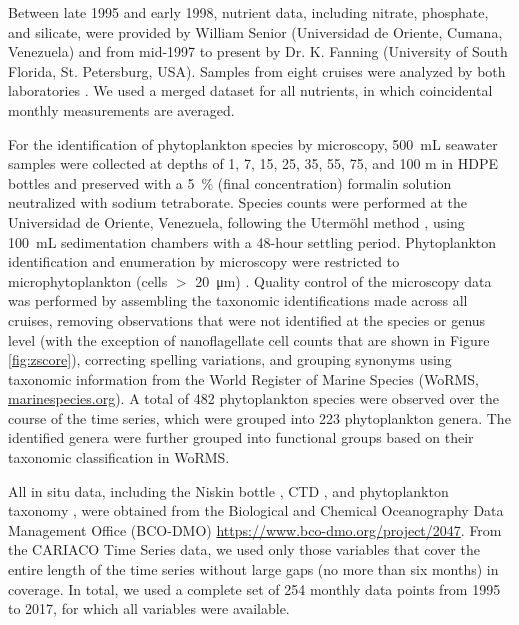 \documentclass[draft]{agujournal2019}
\begin{document}
    Between late 1995 and early 1998, nutrient data, including nitrate, phosphate, and silicate, were provided by William Senior (Universidad de Oriente, Cumana, Venezuela) and from mid-1997 to present by Dr. K. Fanning (University of South Florida, St. Petersburg, USA). Samples from eight cruises were analyzed by both laboratories \cite{taylor_ecosystem_2012}. We used a merged dataset for all nutrients, in which coincidental monthly measurements are averaged.
       
    For the identification of phytoplankton species by microscopy, \qty{500}{\milli\liter} seawater samples were collected at depths of 1, 7, 15, 25, 35, 55, 75, and 100 m in HDPE bottles and preserved with a \qty{5}{\%} (final concentration) formalin solution neutralized with sodium tetraborate. Species counts were performed at the Universidad de Oriente, Venezuela, following the Utermöhl method \cite{hasle1978inverted}, using \qty{100}{\milli\liter} sedimentation chambers with a 48-hour settling period. Phytoplankton identification and enumeration by microscopy were restricted to microphytoplankton (cells $>$ \qty{20}{\micro \meter}) \cite{mutshinda_environmental_2013}.
    Quality control of the microscopy data was performed by assembling the taxonomic identifications made across all cruises, removing observations that were not identified at the species or genus level (with the exception of nanoflagellate cell counts that are shown in Figure \ref{fig:zscore}), correcting spelling variations, and grouping synonyms using taxonomic information from the World Register of Marine Species (WoRMS, \url{marinespecies.org}). A total of 482 phytoplankton species were observed over the course of the time series, which were grouped into 223 phytoplankton genera. The identified genera were further grouped into functional groups based on their taxonomic classification in WoRMS.

    
    All in situ data, including the Niskin bottle \cite{mullerkarger2019niskin}, CTD \cite{mullerkarger2019ctd}, and phytoplankton taxonomy \cite{troccoli2019phytoplankton}, were obtained from the Biological and Chemical Oceanography Data Management Office (BCO-DMO) \url{https://www.bco-dmo.org/project/2047}. 
    From the CARIACO Time Series data, we used only those variables that cover the entire length of the time series without large gaps (no more than six months) in coverage. In total, we used a complete set of 254 monthly data points from 1995 to 2017, for which all variables were available.
\end{document}
